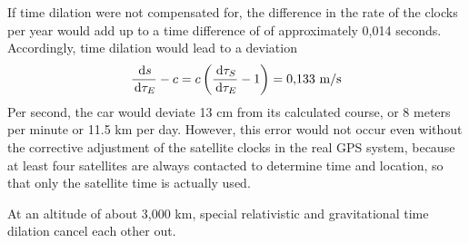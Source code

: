If time dilation were not compensated for, the
difference in the rate of the clocks per year would add up to a time difference
of %
of approximately 0{,}014 seconds.
Accordingly, time dilation would lead to a deviation
\begin{equation}
	\frac{\,\mathrm{d} s}{\,\mathrm{d} \tau_E} - c
	= c \left(\frac{\,\mathrm{d} \tau_S}{\,\mathrm{d} \tau_E} - 1\right)
	= 0{,}133 \mbox{ m$/$s}
\end{equation}
Per second, the car would deviate 13 cm from its calculated
course, or 8 meters per minute or 11.5 km per day.
However, this error would not occur even without the corrective adjustment
of the satellite clocks in the real GPS system, because
at least four satellites are always contacted to determine time and location, so that only the satellite time is actually used.

%
At an altitude of about 3,000 km, 
special relativistic and gravitational time dilation
cancel each other out.
